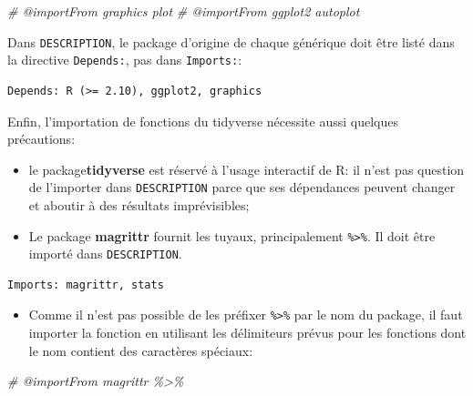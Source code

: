 \documentclass[
  11pt,
  french,
  a4paper,
  extrafontsizes,onecolumn,openright
  ]{memoir}
\newenvironment{Shaded}{\begin{snugshade}}{\end{snugshade}}
\newcommand{\CommentTok}[1]{\textcolor[rgb]{0.56,0.35,0.01}{\textit{#1}}}
\providecommand{\tightlist}{%
  \setlength{\itemsep}{0pt}\setlength{\parskip}{0pt}}
\begin{document}
\scriptsize

\begin{Shaded}
\begin{Highlighting}[]
\CommentTok{\#\textquotesingle{} @importFrom graphics plot}
\CommentTok{\#\textquotesingle{} @importFrom ggplot2 autoplot}
\end{Highlighting}
\end{Shaded}

\normalsize

Dans \texttt{DESCRIPTION}, le package d'origine de chaque générique doit être listé dans la directive \texttt{Depends:}, pas dans \texttt{Imports:}:

\begin{verbatim}
Depends: R (>= 2.10), ggplot2, graphics
\end{verbatim}

Enfin, l'importation de fonctions du tidyverse nécessite aussi quelques précautions:

\begin{itemize}
\tightlist
\item
  le package\textbf{tidyverse} est réservé à l'usage interactif de R: il n'est pas question de l'importer dans \texttt{DESCRIPTION} parce que ses dépendances peuvent changer et aboutir à des résultats imprévisibles;
\item
  Le package \textbf{magrittr} fournit les tuyaux, principalement \texttt{\%\textgreater{}\%}.
  Il doit être importé dans \texttt{DESCRIPTION}.
\end{itemize}

\begin{verbatim}
Imports: magrittr, stats
\end{verbatim}

\begin{itemize}
\tightlist
\item
  Comme il n'est pas possible de les préfixer \texttt{\%\textgreater{}\%} par le nom du package, il faut importer la fonction en utilisant les délimiteurs prévus pour les fonctions dont le nom contient des caractères spéciaux:
\end{itemize}

\scriptsize

\begin{Shaded}
\begin{Highlighting}[]
\CommentTok{\#\textquotesingle{} @importFrom magrittr \textasciigrave{}\%\textgreater{}\%\textasciigrave{}}
\end{Highlighting}
\end{Shaded}
\end{document}

